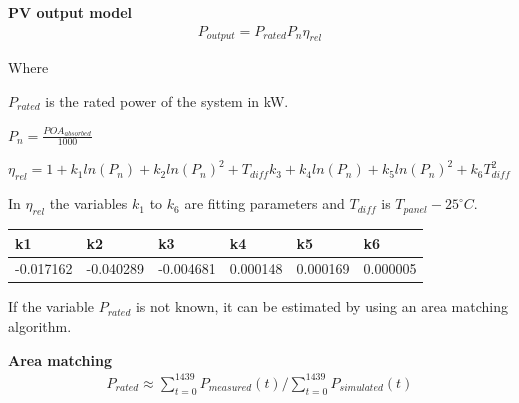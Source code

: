 \noindent\textbf{PV output model}
\begin{equation}
\begin{split}
\label{pv_output_model}
P_{output} = P_{rated}  P_n  \eta_{rel}
\end{split}
\end{equation}

\noindent Where 

$P_{rated}$ is the rated power of the system in kW.

$P_n = \frac{POA_{absorbed}}{1000}$


$\eta_{rel}= 1+k_1 ln(P_n) + k_2 ln(P_n)^2 + T_{diff}k_3 + k_4 ln(P_n) + k_5 ln(P_n)^2 + k_6 T_{diff}^2$

In $\eta_{rel}$ the variables $k_1$ to $k_6$ are fitting parameters and $T_{diff}$ is $T_{panel}-25^\circ C$.

\begin{table}[h]
\begin{tabular}{l|l|l|l|l|l}
k1        & k2        & k3        & k4       & k5       & k6       \\ \hline
-0.017162 & -0.040289 & -0.004681 & 0.000148 & 0.000169 & 0.000005
\end{tabular}
\end{table}

\noindent %
If the variable $P_{rated}$ is not known, it can be estimated by using an area matching algorithm. 






\noindent\textbf{Area matching}
\begin{equation}
\begin{split}
\label{pv_area_matching}
P_{rated} \approx \sum_{t=0}^{1439} P_{measured}(t)/ \sum_{t=0}^{1439} P_{simulated}(t)
\end{split}
\end{equation}

